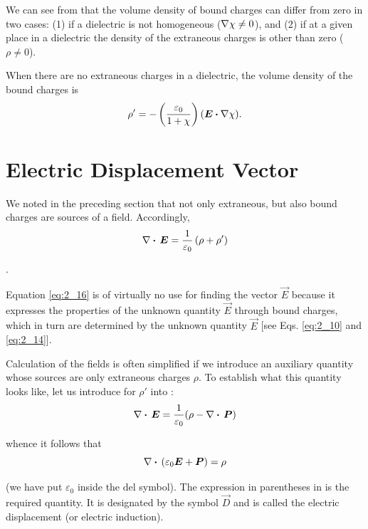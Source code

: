 We can see from  that the volume density of bound charges can differ from zero in two cases: (1) if a dielectric is not homogeneous ($\nabla\chi\neq 0$), and (2) if at a given place in a dielectric the density of the extraneous charges is other than zero ($\rho\neq 0$).

When there are no extraneous charges in a dielectric, the volume density of the bound charges is
\begin{equation}\label{eq:2_15}
    \rho' = - \left(\frac{\varepsilon_0}{1+\chi}\right) (\boldsymbol{E}\boldsymbol{\cdot}\nabla\chi).
\end{equation}

\section{Electric Displacement Vector}\label{sec:2_5}

We noted in the preceding section that not only extraneous, but also bound charges are sources of a field. Accordingly,
\begin{equation}\label{eq:2_16}
    \nabla\boldsymbol{\cdot}\,\boldsymbol{E} = \frac{1}{\varepsilon_0} \left(\rho + \rho'\right)
\end{equation}

.

Equation \eqref{eq:2_16} is of virtually no use for finding the vector $\vec{E}$ because it expresses the properties of the unknown quantity $\vec{E}$ through bound charges, which in turn are determined by the unknown quantity $\vec{E}$ [see Eqs. \eqref{eq:2_10} and \eqref{eq:2_14}].

Calculation of the fields is often simplified if we introduce an auxiliary quantity whose sources are only extraneous charges $\rho$. To establish what this quantity looks like, let us introduce  for $\rho'$ into :
\begin{equation*}
    \nabla\boldsymbol{\cdot}\,\boldsymbol{E} = \frac{1}{\varepsilon_0} (\rho - \nabla\boldsymbol{\cdot}\,\boldsymbol{P})
\end{equation*}

\noindent
whence it follows that
\begin{equation}\label{eq:2_17}
    \nabla\boldsymbol{\cdot}\,(\varepsilon_0\boldsymbol{E} + \boldsymbol{P}) = \rho
\end{equation}

\noindent
(we have put $\varepsilon_0$ inside the del symbol). The expression in parentheses in  is the required quantity. It is designated by the symbol $\vec{D}$ and is called the electric displacement (or electric induction).

